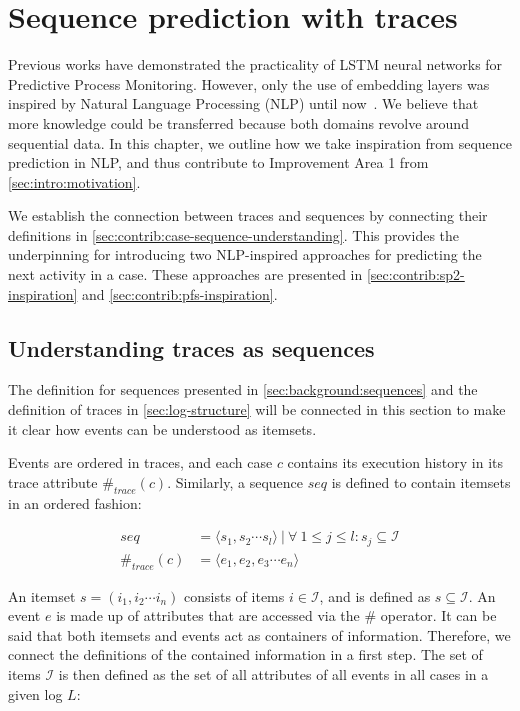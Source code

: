 \chapter{Sequence prediction with traces}
\label{chap:taking-inspiration}
Previous works have demonstrated the practicality of LSTM neural networks for Predictive Process Monitoring. However, only the use of embedding layers was inspired by Natural Language Processing (NLP) until now~\cite{evermann2016}. We believe that more knowledge could be transferred because both domains revolve around sequential data. In this chapter, we outline how we take inspiration from sequence prediction in NLP, and thus contribute to Improvement Area 1 from \autoref{sec:intro:motivation}.

We establish the connection between traces and sequences by connecting their definitions in \autoref{sec:contrib:case-sequence-understanding}. This provides the underpinning for introducing two NLP-inspired approaches for predicting the next activity in a case. These approaches are presented in \autoref{sec:contrib:sp2-inspiration} and \autoref{sec:contrib:pfs-inspiration}.

\section{Understanding traces as sequences}\label{sec:contrib:case-sequence-understanding}
The definition for sequences presented in \autoref{sec:background:sequences} and the definition of traces in \autoref{sec:log-structure} will be connected in this section to make it clear how events can be understood as itemsets.

Events are ordered in traces, and each case $c$ contains its execution history in its trace attribute $\#_{trace}(c)$.
Similarly, a sequence $seq$ is defined to contain itemsets in an ordered fashion:

\begin{equation*}
\begin{split}
seq           &=  \langle s_1,s_2\cdots s_l \rangle\ |\ \forall\ 1 \leq j \leq l: s_j \subseteq \mathscr{I}\\
\#_{trace}(c) &= \langle e_1, e_2, e_3\cdots e_n \rangle
\end{split}
\end{equation*}

An itemset $s = (i_1, i_2 \cdots i_n)$ consists of items $i \in \mathscr{I}$, and is defined as $s \subseteq \mathscr{I}$.
An event $e$ is made up of attributes that are accessed via the $\#$ operator.
It can be said that both itemsets and events act as containers of information.
Therefore, we connect the definitions of the contained information in a first step.
The set of items $\mathscr{I}$ is then defined as the set of all attributes of all events in all cases in a given log $L$:

